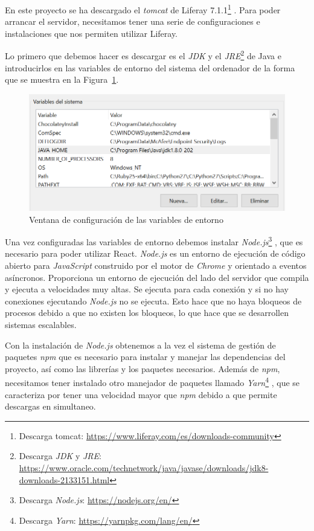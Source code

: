 \documentclass[a4paper, 12pt]{book}
\begin{document}
En este proyecto se ha descargado el \textit{tomcat} de Liferay 7.1.1\footnote{Descarga tomcat: \url{https://www.liferay.com/es/downloads-community}} . Para poder arrancar el servidor, necesitamos tener una serie de configuraciones e instalaciones que nos permiten utilizar Liferay.

\vspace{5mm}
Lo primero que debemos hacer es descargar es el \textit{JDK} y el \textit{JRE}\footnote{Descarga \textit{JDK} y \textit{JRE}: \url{https://www.oracle.com/technetwork/java/javase/downloads/jdk8-downloads-2133151.html}}  de Java e introducirlos en las variables de entorno del sistema del ordenador de la forma que se muestra en la Figura~\ref{fig:variables-entorno}.
\begin{figure}
  \centering
  \includegraphics{img_usadas/variablesentornos.png}
  \caption{Ventana de configuración de las variables de entorno}
  \label{fig:variables-entorno}
\end{figure}

\vspace{5mm}
Una vez configuradas las variables de entorno debemos instalar \textit{Node.js}\footnote{Descarga \textit{Node.js}: \url{https://nodejs.org/en/}} , que es necesario para poder utilizar React. \textit{Node.js} es un entorno de ejecución de código abierto para \textit{JavaScript} construido por el motor de \textit{Chrome} y orientado a eventos asíncronos. Proporciona un entorno de ejecución del lado del servidor que compila y ejecuta a velocidades muy altas. Se ejecuta para cada conexión y si no hay conexiones ejecutando \textit{Node.js} no se ejecuta. Esto hace que no haya bloqueos de procesos debido a que no existen los bloqueos, lo que hace que se desarrollen sistemas escalables.

\vspace{5mm}
Con la instalación de \textit{Node.js} obtenemos a la vez el sistema de gestión de paquetes \textit{npm} que es necesario para instalar y manejar las dependencias del proyecto, así como las librerías y los paquetes necesarios. Además de \textit{npm}, necesitamos tener instalado otro manejador de paquetes llamado \textit{Yarn}\footnote{Descarga \textit{Yarn}: \url{https://yarnpkg.com/lang/en/}} , que se caracteriza por tener una velocidad mayor que \textit{npm} debido a que permite descargas en simultaneo.
\end{document}
